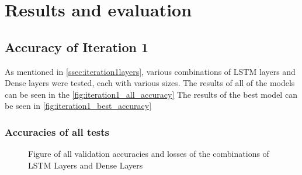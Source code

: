 \chapter{Results and evaluation} \label{chap:results}
\section{Accuracy of Iteration 1}
As mentioned in \autoref{ssec:iteration1layers}, various combinations of LSTM layers and Dense layers were tested,
each with various sizes. The results of all of the models can be seen in the \autoref{fig:iteration1_all_accuracy}
The results of the best model can be seen in \autoref{fig:iteration1_best_accuracy}
\subsection{Accuracies of all tests}
\begin{figure}[ht]
    \centering
    \qquad
    
    \caption[Figure of accuracies and losses for Iteration 1]{Figure of all validation accuracies and losses of the combinations of LSTM Layers and Dense Layers}
    \label{fig:iteration1_all_accuracy}
\end{figure}
\FloatBarrier

